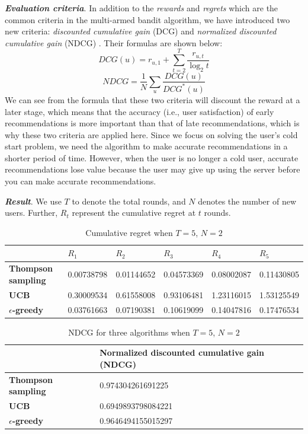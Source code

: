 \textbf{\textit{Evaluation criteria}}. In addition to the \textit{rewards} and \textit{regrets} which are the common criteria in the multi-armed bandit algorithm, we have introduced two new criteria: \textit{discounted cumulative gain} (DCG) and \textit{normalized discounted cumulative gain} (NDCG) \cite{ndcg}. Their formulas are shown below:
\begin{equation}
    D C G(u)=r_{u, 1}+\sum_{t=2}^{T} \frac{r_{u, t}}{\log _{2} t}
\end{equation}
\begin{equation}
    N D C G=\frac{1}{N} \sum_{u} \frac{D C G(u)}{D C G^{*}(u)}
\end{equation}
We can see from the formula that these two criteria will discount the reward at a later stage, which means that the accuracy (i.e., user satisfaction) of early recommendations is more important than that of late recommendations, which is why these two criteria are applied here. Since we focus on solving the user's cold start problem, we need the algorithm to make accurate recommendations in a shorter period of time. However, when the user is no longer a cold user, accurate recommendations lose value because the user may give up using the server before you can make accurate recommendations.

\textbf{\textit{Result}}. We use $T$ to denote the total rounds, and $N$ denotes the number of new users. Further, $R_{t}$ represent the cumulative regret at $t$ rounds.
\begin{table}[htbp]
\centering
\begin{tabular}{llllll}
\hline
                  & $R_{1}$ & $R_{2}$ & $R_{3}$ & $R_{4}$   & $R_{5}$   \\ \hline
\textbf{Thompson sampling} & 0.00738798               & 0.01144652 & 0.04573369 & 0.08002087 & 0.11430805 \\
\textbf{UCB }              & 0.30009534 &0.61558008& 0.93106481& 1.23116015& 1.53125549 \\
\textbf{$\epsilon$-greedy }& 0.03761663 &0.07190381& 0.10619099& 0.14047816& 0.17476534
\end{tabular}
\caption{Cumulative regret when $T=5$, $N=2$}
\end{table}


\begin{table}[htbp]
\centering
\begin{tabular}{ll}
\hline
                  & \textbf{Normalized discounted cumulative gain (NDCG) } \\\hline
\textbf{Thompson sampling} & 0.974304261691225                                            \\
\textbf{UCB}          & 0.6949893798084221                                            \\
\textbf{$\epsilon$-greedy } & 0.9646494155015297        
\end{tabular}
\caption{NDCG for three algorithms when $T=5$, $N=2$}
\end{table}

